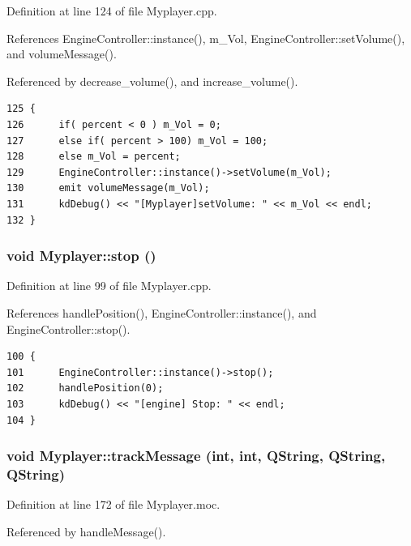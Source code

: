 Definition at line 124 of file Myplayer.cpp.

References Engine\-Controller::instance(), m\_\-Vol, Engine\-Controller::set\-Volume(), and volume\-Message().

Referenced by decrease\_\-volume(), and increase\_\-volume().



\footnotesize\begin{verbatim}125 {
126      if( percent < 0 ) m_Vol = 0;
127      else if( percent > 100) m_Vol = 100;
128      else m_Vol = percent;
129      EngineController::instance()->setVolume(m_Vol);
130      emit volumeMessage(m_Vol);
131      kdDebug() << "[Myplayer]setVolume: " << m_Vol << endl;
132 }
\end{verbatim}\normalsize 
{}
\subsubsection{\setlength{\rightskip}{0pt plus 5cm}void Myplayer::stop ()\hspace{0.3cm}{\tt  [slot]}}\label{classMyplayer_Myplayeri3}




Definition at line 99 of file Myplayer.cpp.

References handle\-Position(), Engine\-Controller::instance(), and Engine\-Controller::stop().



\footnotesize\begin{verbatim}100 {     
101      EngineController::instance()->stop();
102      handlePosition(0);
103      kdDebug() << "[engine] Stop: " << endl;
104 }
\end{verbatim}\normalsize 
{}
\subsubsection{\setlength{\rightskip}{0pt plus 5cm}void Myplayer::track\-Message (int, int, QString, QString, QString)\hspace{0.3cm}{\tt  [signal]}}\label{classMyplayer_Myplayerl0}




Definition at line 172 of file Myplayer.moc.

Referenced by handle\-Message().



